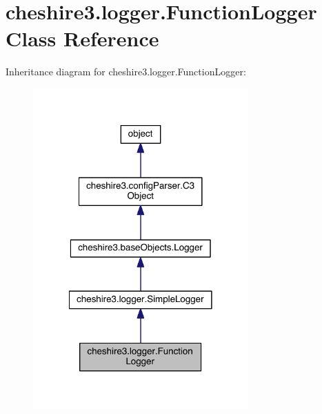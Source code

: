 \hypertarget{classcheshire3_1_1logger_1_1_function_logger}{\section{cheshire3.\-logger.\-Function\-Logger Class Reference}
\label{classcheshire3_1_1logger_1_1_function_logger}
}


Inheritance diagram for cheshire3.\-logger.\-Function\-Logger\-:
\nopagebreak
\begin{figure}[H]
\begin{center}
\leavevmode
\includegraphics[width=234pt]{classcheshire3_1_1logger_1_1_function_logger__inherit__graph}
\end{center}
\end{figure}


